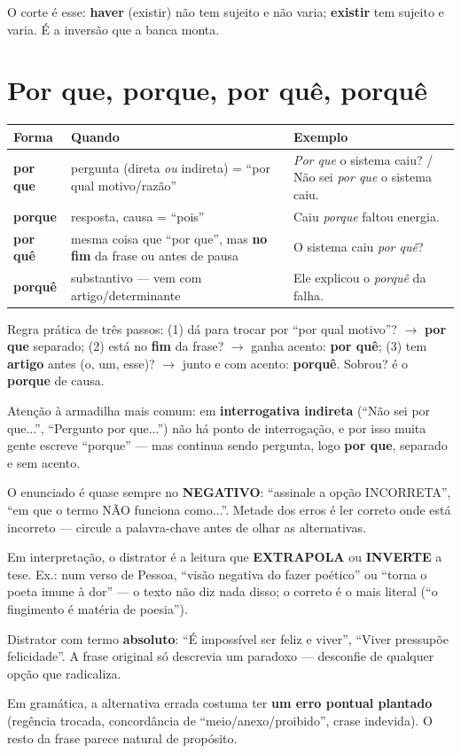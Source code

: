 O corte é esse: \textbf{haver} (existir) não tem sujeito e não varia;
\textbf{existir} tem sujeito e varia. É a inversão que a banca monta.

\section{Por que, porque, por quê, porquê}

\begin{center}
\begin{tabular}{@{}p{2.2cm}p{4cm}p{4.8cm}@{}}
\toprule
\textbf{Forma} & \textbf{Quando} & \textbf{Exemplo} \\
\midrule
\textbf{por que} & pergunta (direta \emph{ou} indireta) = ``por qual motivo/razão'' & \emph{Por que} o sistema caiu? / Não sei \emph{por que} o sistema caiu. \\
\textbf{porque} & resposta, causa = ``pois'' & Caiu \emph{porque} faltou energia. \\
\textbf{por quê} & mesma coisa que ``por que'', mas \textbf{no fim} da frase ou antes de pausa & O sistema caiu \emph{por quê}? \\
\textbf{porquê} & substantivo --- vem com artigo/determinante & Ele explicou o \emph{porquê} da falha. \\
\bottomrule
\end{tabular}
\end{center}

Regra prática de três passos: (1) dá para trocar por ``por qual motivo''?
$\to$ \textbf{por que} separado; (2) está no \textbf{fim} da frase? $\to$
ganha acento: \textbf{por quê}; (3) tem \textbf{artigo} antes (o, um, esse)?
$\to$ junto e com acento: \textbf{porquê}. Sobrou? é o \textbf{porque} de
causa.

Atenção à armadilha mais comum: em \textbf{interrogativa indireta} (``Não sei
por que...'', ``Pergunto por que...'') não há ponto de interrogação, e por
isso muita gente escreve ``porque'' --- mas continua sendo pergunta, logo
\textbf{por que}, separado e sem acento.

\begin{pegadinha}
O enunciado é quase sempre no \textbf{NEGATIVO}: ``assinale a opção
INCORRETA'', ``em que o termo NÃO funciona como...''. Metade dos erros é ler
correto onde está incorreto --- circule a palavra-chave antes de olhar as
alternativas.

Em interpretação, o distrator é a leitura que \textbf{EXTRAPOLA} ou
\textbf{INVERTE} a tese. Ex.: num verso de Pessoa, ``visão negativa do fazer
poético'' ou ``torna o poeta imune à dor'' --- o texto não diz nada disso; o
correto é o mais literal (``o fingimento é matéria de poesia'').

Distrator com termo \textbf{absoluto}: ``É impossível ser feliz e viver'',
``Viver pressupõe felicidade''. A frase original só descrevia um paradoxo ---
desconfie de qualquer opção que radicaliza.

Em gramática, a alternativa errada costuma ter \textbf{um erro pontual
plantado} (regência trocada, concordância de ``meio/anexo/proibido'', crase
indevida). O resto da frase parece natural de propósito.
\end{pegadinha}

